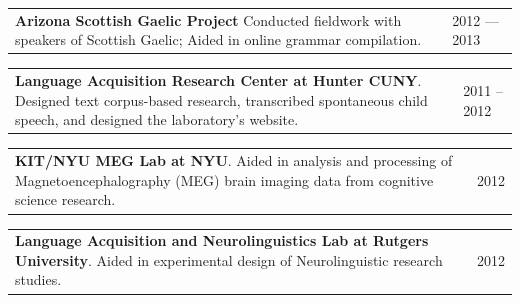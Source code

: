 \documentclass{resume} %
\begin{document}
\begin{tabular}{@{}p{}p{}@{}}
  {\bf Arizona Scottish Gaelic Project}
  Conducted fieldwork with speakers of Scottish Gaelic; Aided in online grammar compilation.
  &
  {2012 --- 2013}
\end{tabular}



\begin{tabular}{@{}p{}p{}@{}}
  {\bf Language Acquisition Research Center at Hunter CUNY}.
  Designed text corpus-based research, transcribed spontaneous child speech, and designed the laboratory's website.
  &
  {2011 --2012}
\end{tabular}


\begin{tabular}{@{}p{}p{}@{}}
  {\bf KIT/NYU MEG Lab at NYU}.
  Aided in analysis and processing of Magnetoencephalography (MEG) brain imaging data from cognitive science research.
  &
  {2012}
\end{tabular}


\begin{tabular}{@{}p{}p{}@{}}
  {\bf Language Acquisition and Neurolinguistics Lab at Rutgers University}.
  Aided in experimental design of Neurolinguistic research studies.
  &
{2012}
\end{tabular}
\end{document}

